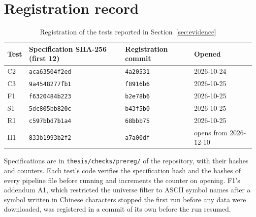 \documentclass[12pt]{article}
\theoremstyle{definition}
\theoremstyle{remark}
\begin{document}
\section{Registration record}\label{app:registry}

\begin{table}[ht]
\centering\footnotesize
\begin{threeparttable}
\caption{Registration of the tests reported in Section~\ref{sec:evidence}}\label{tab:registry}
\begin{tabular}{llll}
\toprule
Test & Specification SHA-256 (first 12) & Registration commit & Opened\\
\midrule
C2 & \texttt{aca63504f2ed} & \texttt{4a20531} & 2026-10-24\\
C3 & \texttt{9a4548277fb1} & \texttt{f8916b6} & 2026-10-25\\
F1 & \texttt{f6320484b223} & \texttt{b2e78b6} & 2026-10-25\\
S1 & \texttt{5dc805bb820c} & \texttt{b43f5b0} & 2026-10-25\\
R1 & \texttt{c597bbd7b1a4} & \texttt{68bbb75} & 2026-10-25\\
H1 & \texttt{833b1993b2f2} & \texttt{a7a00df} & opens from 2026-12-10\\
\bottomrule
\end{tabular}
\begin{tablenotes}\footnotesize\item Specifications are in \texttt{thesis/checks/prereg/} of the repository, with their hashes and counters. Each test's code verifies the specification hash and the hashes of every pipeline file before running and increments the counter on opening. F1's addendum A1, which restricted the universe filter to ASCII symbol names after a symbol written in Chinese characters stopped the first run before any data were downloaded, was registered in a commit of its own before the run resumed.\end{tablenotes}
\end{threeparttable}
\end{table}
\end{document}
